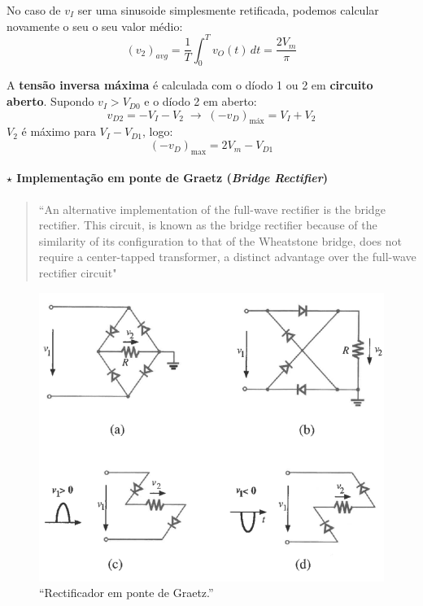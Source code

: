 \noindent No caso de $v_I$ ser uma sinusoide simplesmente retificada, podemos calcular novamente o seu o seu valor médio:
$$
    \boxed{(v_2)_{\textit{avg}} = \frac{1}{T} \int_{0}^{T} v_O(t) \, dt = \dfrac{2V_m}{\pi}}
$$

\noindent A \textbf{tensão inversa máxima} é calculada com o díodo 1 ou 2 em \textbf{circuito aberto}. Supondo $v_I > V_{D0}$ e o díodo 2 em aberto:
$$
    v_{D2} = -V_I - V_2\; \pmb{\longrightarrow}\; (-v_D)_{\text{máx}} = V_I + V_2
$$
\noindent $V_2$ é máximo para $V_I - V_{D1}$, logo:
$$
    \boxed{(-v_D)_{\text{max}} = 2V_m - V_{D1}}
$$

\clearpage
\paragraph[2.2.1.2 Implementação em ponte de Graetz]{$\pmb{\star}$ Implementação em ponte de Graetz (\textit{Bridge Rectifier})}\mbox{}

\begin{quote}
    ``An alternative implementation of the full-wave rectifier is the bridge rectifier. This circuit, is known as the bridge rectifier because of the similarity of its configuration to that of the Wheatstone bridge, does not require a center-tapped transformer, a distinct advantage over the full-wave rectifier circuit"\cite{sedra-smith:microelectronic-circuits}
\end{quote}

\begin{figure}[H]
    \centering
    \includegraphics[width = 0.65\linewidth]{img/2/ponte-graetz.png}
    \caption{``Rectificador em ponte de Graetz.''\cite{medeiros:ICEE}}
    \label{fig:ponte-graetz}
\end{figure}

